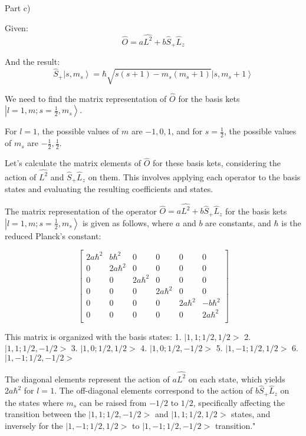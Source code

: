 Part c)

Given:
\[ \hat{O} = a\hat{L^{2}} + b\hat{S}_{+}\hat{L}_{z} \]

And the result:
\[ \hat{S}_{+} \left|s, m_{s} \right> = \hbar \sqrt{s(s+1) - m_{s}(m_{s}+1)} \left|s, m_{s}+1 \right> \]

We need to find the matrix representation of \(\hat{O}\) for the basis kets \(\left|l=1, m; s=\frac{1}{2}, m_{s} \right>\).

For \(l = 1\), the possible values of \(m\) are \(-1, 0, 1\), and for \(s = \frac{1}{2}\), the possible values of \(m_s\) are \(-\frac{1}{2}, \frac{1}{2}\).

Let's calculate the matrix elements of \(\hat{O}\) for these basis kets, considering the action of \(\hat{L^2}\) and \(\hat{S}_{+}\hat{L}_{z}\) on them. This involves applying each operator to the basis states and evaluating the resulting coefficients and states.

The matrix representation of the operator \(\hat{O} = a\hat{L^{2}} + b\hat{S}_{+}\hat{L}_{z}\) for the basis kets \(\left|l=1, m; s=\frac{1}{2}, m_{s} \right>\) is given as follows, where \(a\) and \(b\) are constants, and \(\hbar\) is the reduced Planck's constant:

\[
\begin{bmatrix}
2a\hbar^2 & b\hbar^2 & 0 & 0 & 0 & 0 \\
0 & 2a\hbar^2 & 0 & 0 & 0 & 0 \\
0 & 0 & 2a\hbar^2 & 0 & 0 & 0 \\
0 & 0 & 0 & 2a\hbar^2 & 0 & 0 \\
0 & 0 & 0 & 0 & 2a\hbar^2 & -b\hbar^2 \\
0 & 0 & 0 & 0 & 0 & 2a\hbar^2 \\
\end{bmatrix}
\]

This matrix is organized with the basis states:
1. \(|1, 1; 1/2, 1/2>\)
2. \(|1, 1; 1/2, -1/2>\)
3. \(|1, 0; 1/2, 1/2>\)
4. \(|1, 0; 1/2, -1/2>\)
5. \(|1, -1; 1/2, 1/2>\)
6. \(|1, -1; 1/2, -1/2>\)

The diagonal elements represent the action of \(a\hat{L^{2}}\) on each state, which yields \(2a\hbar^2\) for \(l=1\). The off-diagonal elements correspond to the action of \(b\hat{S}_{+}\hat{L}_{z}\) on the states where \(m_s\) can be raised from \(-1/2\) to \(1/2\), specifically affecting the transition between the \(|1, 1; 1/2, -1/2>\) and \(|1, 1; 1/2, 1/2>\) states, and inversely for the \(|1, -1; 1/2, 1/2>\) to \(|1, -1; 1/2, -1/2>\) transition."



